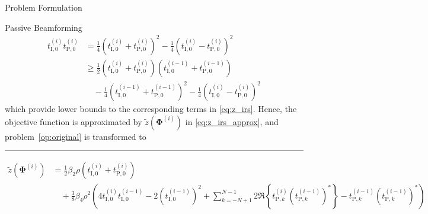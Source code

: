 \documentclass[journal]{IEEEtran}
\begin{document}
\begin{section}{Problem Formulation}
\begin{subsection}{Passive Beamforming}
\begin{align}
				t_{\mathrm{I},0}^{(i)} t_{\mathrm{P},0}^{(i)}
				& = \frac{1}{4}(t_{\mathrm{I},0}^{(i)} + t_{\mathrm{P},0}^{(i)})^2 - \frac{1}{4}(t_{\mathrm{I},0}^{(i)} - t_{\mathrm{P},0}^{(i)})^2\nonumber\\
				& \ge \frac{1}{2}(t_{\mathrm{I},0}^{(i)} + t_{\mathrm{P},0}^{(i)})(t_{\mathrm{I},0}^{(i-1)} + t_{\mathrm{P},0}^{(i-1)})\nonumber\\
				& \quad - \frac{1}{4}(t_{\mathrm{I},0}^{(i-1)} + t_{\mathrm{P},0}^{(i-1)})^2 - \frac{1}{4}(t_{\mathrm{I},0}^{(i)} - t_{\mathrm{P},0}^{(i)})^2\label{eq:taylor_3}
			\end{align}
			which provide lower bounds to the corresponding terms in \eqref{eq:z_irs}. Hence, the objective function is approximated by $\tilde{z}(\boldsymbol{\Phi}^{(i)})$ in \eqref{eq:z_irs_approx}, and problem~\eqref{op:original} is transformed to
			\begin{figure*}[!b]
				\hrule
				\begin{align}
					\tilde{z}(\boldsymbol{\Phi}^{(i)})
					& = \frac{1}{2}{\beta_2}{\rho}(t_{\mathrm{I},0}^{(i)}+t_{\mathrm{P},0}^{(i)})\nonumber\\
					& \quad + \frac{3}{8}{\beta_4}{\rho^2} \left(4 t_{\mathrm{I},0}^{(i)}t_{\mathrm{I},0}^{(i-1)} - 2 (t_{\mathrm{I},0}^{(i-1)})^2 + \sum_{k=-N+1}^{N-1}{2 \Re\left\{t_{\mathrm{P},k}^{(i)} (t_{\mathrm{P},k}^{(i-1)})^*\right\} - t_{\mathrm{P},k}^{(i-1)} (t_{\mathrm{P},k}^{(i-1)})^*}\right)\nonumber\\

\end{align}
\end{figure*}
\end{subsection}
\end{section}
\end{document}
